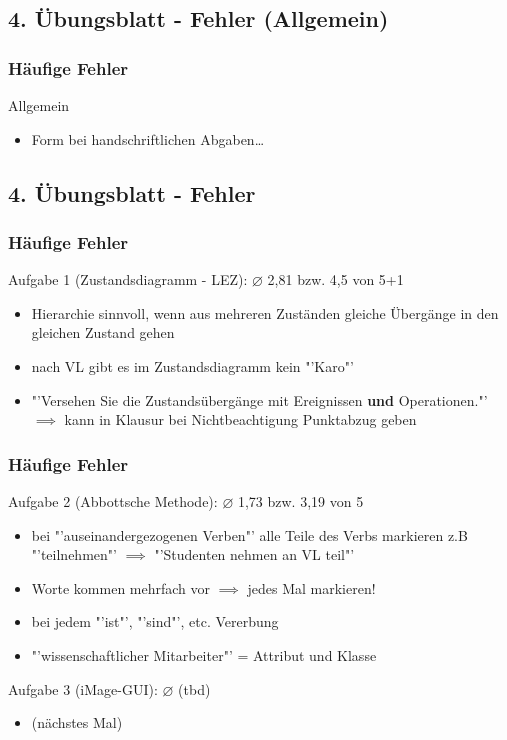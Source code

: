 \documentclass[18pt]{beamer}
\begin{document}
	\subsection{4. Übungsblatt - Fehler (Allgemein)}
	\begin{frame}
		\frametitle{Häufige Fehler}
		\begin{block}{Allgemein}
			\begin{itemize}
				\item Form bei handschriftlichen Abgaben\dots
			\end{itemize}
		\end{block}
	\end{frame}
	
	\subsection{4. Übungsblatt - Fehler}
	\begin{frame}
		\frametitle{Häufige Fehler}
		\begin{block}{Aufgabe 1 (Zustandsdiagramm - LEZ): $\diameter$ 2,81 bzw. 4,5 von 5+1}
			\begin{itemize}
				\pause 
				\item Hierarchie sinnvoll, wenn aus mehreren Zuständen gleiche Übergänge in den gleichen Zustand gehen \pause
				\item nach VL gibt es im Zustandsdiagramm kein "'Karo"' \pause
				\item "'Versehen Sie die Zustandsübergänge mit Ereignissen \textbf{und} Operationen."' \pause
				\linebreak $\implies$ kann in Klausur bei Nichtbeachtigung Punktabzug geben
			\end{itemize}
		\end{block}
	\end{frame}

	\begin{frame}
		\frametitle{Häufige Fehler}
		\begin{block}{Aufgabe 2 (Abbottsche Methode): $\diameter$ 1,73 bzw. 3,19 von 5}
			\begin{itemize}
				\pause 
				\item bei "'auseinandergezogenen Verben"' alle Teile des Verbs markieren \pause
				\linebreak z.B "'teilnehmen"' $\implies$ "'Studenten nehmen an VL teil"' \pause
				\item Worte kommen mehrfach vor $\implies$ jedes Mal markieren! \pause
				\item bei jedem "'ist"', "'sind"', etc. Vererbung \pause
				\item "'wissenschaftlicher Mitarbeiter"' = Attribut und Klasse
			\end{itemize}
		\end{block}
		\pause 
		\begin{block}{Aufgabe 3 (iMage-GUI): $\diameter$ (tbd)}
			\begin{itemize}
				\item	(nächstes Mal)
			\end{itemize}
		\end{block}
	\end{frame}
\end{document}
